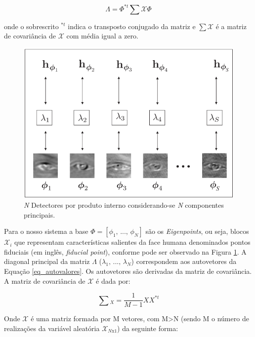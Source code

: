 \begin{equation}\label{eq_autovalores}
\Lambda  = {\Phi ^{*t}}\sum\mathcal{X} \Phi
\end{equation}

onde o sobrescrito $^{*t}$ indica o transposto conjugado da matriz e $\sum \mathcal{X}$ é a matriz de covariância de $\mathcal{X}$ com média igual a zero.

\begin{figure}[!htb]
\centering
\includegraphics[scale=0.7]{figuras/esquema_Matriz.png}
\caption{\textit{N} Detectores por produto interno considerando-se \textit{N} componentes principais.}
\label{fig_esquemaMatriz}
\end{figure}

Para o nosso sistema a base $\Phi  = [{\phi _1},\,...,\,{\phi _N}]$ são os \textit{Eigenpoints}, ou seja, blocos ${\mathcal{X}_i}$ que representam características salientes da face humana denominados pontos fiduciais (em inglês, \textit{fiducial point}), conforme pode ser observado na Figura \ref{fig_esquemaMatriz}. A diagonal principal da matriz $\Lambda$ (${\lambda _1},\,...,\,{\lambda _N}$) correspondem aos autovetores da Equação \eqref{eq_autovalores}. Os autovetores são derivadas da matriz de covariância. A matriz de covariância de $\mathcal{X}$ é dada por:

\begin{equation}\label{eq_MatrizDeCovariancia}
\sum {_X = \frac{1}{{M - 1}}X{X^{*t}}}
\end{equation}

Onde  $\mathcal{X}$ é uma matriz formada por M vetores, com M>N (sendo M o número de realizações da variável aleatória $\mathcal{X}_{N\text{x}1}$) da seguinte forma:

